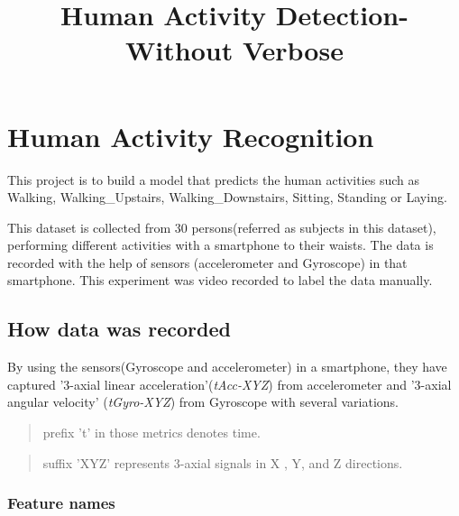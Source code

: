 \documentclass[11pt]{article}
\title{Human Activity Detection-Without Verbose }
\begin{document}
    
    
    \maketitle
    
    

    
    \section{Human Activity Recognition}\label{human-activity-recognition}

This project is to build a model that predicts the human activities such
as Walking, Walking\_Upstairs, Walking\_Downstairs, Sitting, Standing or
Laying.

This dataset is collected from 30 persons(referred as subjects in this
dataset), performing different activities with a smartphone to their
waists. The data is recorded with the help of sensors (accelerometer and
Gyroscope) in that smartphone. This experiment was video recorded to
label the data manually.

\subsection{How data was recorded}\label{how-data-was-recorded}

By using the sensors(Gyroscope and accelerometer) in a smartphone, they
have captured '3-axial linear acceleration'(\emph{tAcc-XYZ}) from
accelerometer and '3-axial angular velocity' (\emph{tGyro-XYZ}) from
Gyroscope with several variations.

\begin{quote}
prefix 't' in those metrics denotes time.
\end{quote}

\begin{quote}
suffix 'XYZ' represents 3-axial signals in X , Y, and Z directions.
\end{quote}

\subsubsection{Feature names}\label{feature-names}
\end{document}
